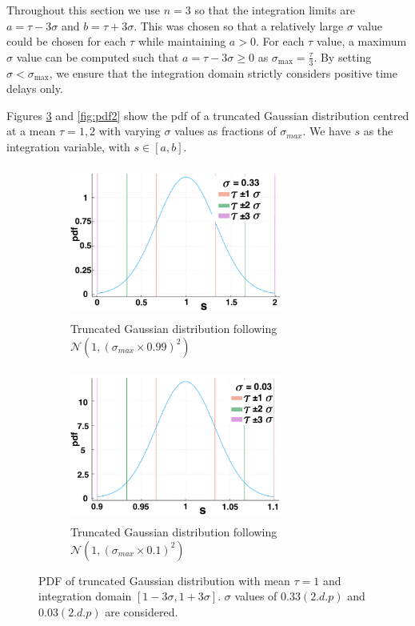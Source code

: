 Throughout this section we use $n=3$ so that the integration limits are $a=\tau-3\sigma$ and $b=\tau+3\sigma$. This was chosen so that a relatively large $\sigma$ value could be chosen for each $\tau$ while maintaining $a>0$. For each $\tau$ value, a maximum $\sigma$ value can be computed such that $a=\tau-3\sigma\geq0$ as $\sigma_{\max}=\frac{\tau}{3}$. By setting $\sigma<\sigma_{\max}$, we ensure that the integration domain strictly considers positive time delays only.

Figures \ref{fig:pdf1} and \ref{fig:pdf2} show the pdf of a truncated Gaussian distribution centred at a mean $\tau=1,2$ with varying $\sigma$ values as fractions of $\sigma_{max}$. We have $s$ as the integration variable, with $s\in[a,b]$.

\begin{figure}[H]
    \centering
    \begin{subfigure}[b]{0.45\textwidth}
        \centering
        \includegraphics[width=7cm,height=5cm]{t1sig1.png}
        \caption{Truncated Gaussian distribution following $\mathcal{N}(1,(\sigma_{max}\times0.99)^2)$}
        \label{}
    \end{subfigure}
    \hfill
    \begin{subfigure}[b]{0.45\textwidth}
        \centering
        \includegraphics[width=7cm,height=5cm]{t1sig2.png}
        \caption{Truncated Gaussian distribution following $\mathcal{N}(1,(\sigma_{max}\times0.1)^2)$}
        \label{}
    \end{subfigure}
\caption{PDF of truncated Gaussian distribution with mean $\tau=1$ and integration domain $[1-3\sigma,1+3\sigma]$. $\sigma$ values of $0.33(2.d.p)$ and $0.03(2.d.p)$ are considered.}
\label{fig:pdf1}
\end{figure}
